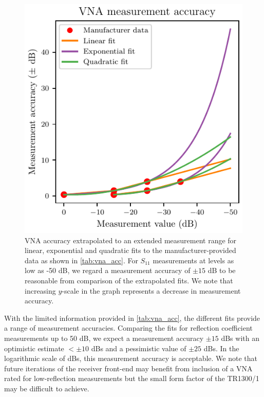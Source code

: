 \begin{figure}
    \centering
    \includegraphics{vna_accuracy}
    \caption{VNA accuracy extrapolated to an extended measurement range for linear, exponential and quadratic fits to the manufacturer-provided data as shown in \cref{tab:vna_acc}. For $S_{11}$ measurements at levels as low as -50 dB, we regard a measurement accuracy of $\pm 15$ dB to be reasonable from comparison of the extrapolated fits. We note that increasing $y$-scale in the graph represents a decrease in measurement accuracy.}
    \label{fig:vna_acc}
\end{figure}
With the limited information provided in \cref{tab:vna_acc}, the different fits provide a range of measurement accuracies. Comparing the fits for reflection coefficient measurements up to 50 dB, we expect a measurement accuracy $\pm 15$ dBs with an optimistic estimate $< \pm 10$ dBs and a pessimistic value of $\pm 25$ dBs. In the logarithmic scale of dBs, this measurement accuracy is acceptable. We note that future iterations of the receiver front-end may benefit from inclusion of a VNA rated for low-reflection measurements but the small form factor of the TR1300/1 may be difficult to achieve.

